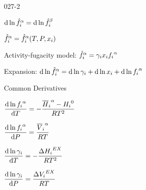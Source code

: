 \begin{mitframe}{027-2}

    
\begin{listone}

		\item $\mathrm{d}\ln{\hat{\fug}_{\state}}^{\tdiff}=\mathrm{d}\ln{\hat{\fug}_{\state}}^{\texpcoeff}$
    
    	\begin{listtwo}
	
    		\item ${\hat{\fug}_{\state}}^{\tdiff}={\hat{\fug}_{\state}}^{\tdiff}(\Temp, \p, \conjcoor)$
            
            \item Activity-fugacity model: ${\hat{\fug}_{\state}}^{\tdiff}=\actcoeff\conjcoor{\fug_{\state}}^{\tdiff}$
	
		\end{listtwo}
	
   				 \item Expansion: $\mathrm{d}\ln{\hat{\fug}_{\state}}^{\tdiff}=\mathrm{d}\ln\actcoeff+\mathrm{d}\ln\conjcoor+\mathrm{d}\ln{\fug_{\state}}^{\tdiff}$
    
    	\begin{listtwo}

				\item Common Derivatives
            
            \begin{listthree}
			
            	\item $\dfrac{\mathrm{d}\ln{{\fug}_{\state}}^{\tdiff}}{\mathrm{d}\Temp}=-\dfrac{{\overline{\enthalpy}_{\state}}^{\tdiff}-{\enthalpy_{\state}}^{\init}}{\gasconst\Temp^{2}}$

            	\item $\dfrac{\mathrm{d}\ln{{\fug}_{\state}}^{\tdiff}}{\mathrm{d}\p}=\dfrac{{\overline{\vol}_{\state}}^{\tdiff}}{\gasconst\Temp}$
            
            	\item $\dfrac{\mathrm{d}\ln\actcoeff}{\mathrm{d}\Temp}=-\dfrac{\iipf{\enthalpy_{\state}}^{\exfunc}}{\gasconst\Temp^{2}}$
            
            	\item $\dfrac{\mathrm{d}\ln\actcoeff}{\mathrm{d}\p}=\dfrac{\iipf{\vol_{\state}}^{\exfunc}}{\gasconst\Temp}$
            

\end{listthree}
\end{listtwo}
\end{listone}
\end{mitframe}
